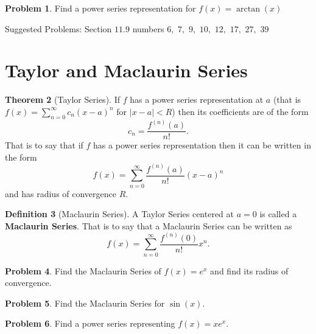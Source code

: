 \documentclass[letterpaper, twoside, 12pt]{book}
\theoremstyle{definition}
\newtheorem{theorem}{Theorem}
\theoremstyle{definition}
\newtheorem{definition}[theorem]{Definition}
\newtheorem{problem}[theorem]{Problem}
\begin{document}
\vfill

\begin{problem}
 Find a power series representation for $f(x) = \arctan\left(x\right)$
\end{problem}

\vfill

\noindent Suggested Problems: Section $11.9$ numbers $6,$ $7,$ $9,$ $10,$ $12,$ $17,$ $27,$ $39$

\newpage

\section{Taylor and Maclaurin Series}

\begin{theorem}[Taylor Series]
 If $f$ has a power series representation at $a$ (that is
 $f(x) = \sum_{n=0}^{\infty} c_n \left(x-a\right)^n$ for $\left|x-a\right| <R$)
 then its coefficients are of the form
 $$c_n = \frac{f^{\left(n\right)}\left(a\right)}{n!}.$$
 That is to say that if $f$ has a power series representation then it can be
 written in the form
 $$f(x) = \sum_{n=0}^{\infty} \frac{f^{\left(n\right)}\left(a\right)}{n!} \left(x-a\right)^n$$
 and has radius of convergence $R$.
\end{theorem}

\begin{definition}[Maclaurin Series]
 A Taylor Series centered at $a=0$ is called a \textbf{Maclaurin Series}.  That is to say that a Maclaurin Series can be written as $$f(x) = \sum_{n=0}^{\infty} \frac{f^{\left(n\right)}\left(0\right)}{n!}x^n.$$
\end{definition}

\begin{problem}
 Find the Maclaurin Series of $f(x) = e^x$ and find its radius of convergence.
\end{problem}

\vfill

\newpage

\begin{problem}
 Find the Maclaurin Series for $\sin\left(x\right)$.
\end{problem}

\vfill

\begin{problem}
 Find a power series representing $f(x) = x e^x$.
\end{problem}

\vfill
\end{document}
